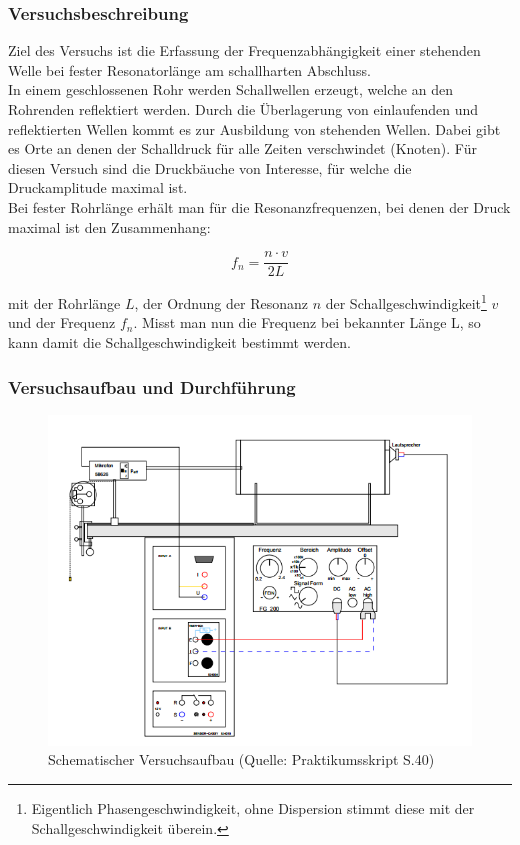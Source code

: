 \documentclass[12pt,a4paper]{article}
\begin{document}
\subsubsection{Versuchsbeschreibung}

Ziel des Versuchs ist die Erfassung der Frequenzabhängigkeit einer stehenden Welle bei fester Resonatorlänge am schallharten Abschluss.\\
In einem geschlossenen Rohr werden Schallwellen erzeugt, welche an den Rohrenden reflektiert werden. Durch die Überlagerung von einlaufenden und reflektierten Wellen kommt es zur Ausbildung von stehenden Wellen. Dabei gibt es Orte an denen der Schalldruck für alle Zeiten verschwindet (Knoten). Für diesen Versuch sind die Druckbäuche von Interesse, für welche die Druckamplitude maximal ist.\\
Bei fester Rohrlänge erhält man für die Resonanzfrequenzen, bei denen der Druck maximal ist den Zusammenhang:

\begin{equation}
f_n=\frac{n\cdot v}{2L}
\end{equation}

mit der Rohrlänge $L$, der Ordnung der Resonanz $n$ der Schallgeschwindigkeit\footnote{Eigentlich Phasengeschwindigkeit, ohne Dispersion stimmt diese mit der Schallgeschwindigkeit überein.}  $v$ und der Frequenz $f_n$.
Misst man nun die Frequenz bei bekannter Länge L, so kann damit die Schallgeschwindigkeit bestimmt werden.\\

\subsubsection{Versuchsaufbau und Durchführung}

\begin{figure}
	\includegraphics[width=\linewidth]{aufbau}
	\caption[Aufbau]{Schematischer Versuchsaufbau (Quelle: Praktikumsskript S.40)}
	\label{fig:aufbseite40}
\end{figure}
\end{document}
